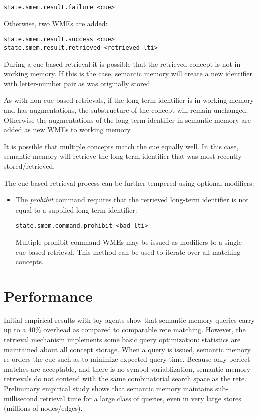 \begin{verbatim}
state.smem.result.failure <cue>
\end{verbatim}

Otherwise, two WMEs are added:

\begin{verbatim}
state.smem.result.success <cue>
state.smem.result.retrieved <retrieved-lti>
\end{verbatim}

During a cue-based retrieval it is possible that the retrieved concept is not in working memory.  If this is the case, semantic memory will create a new identifier with letter-number pair as was originally stored.

As with non-cue-based retrievals, if the long-term identifier is in working memory and has augmentations, the substructure of the concept will remain unchanged. Otherwise the augmentations of the long-term identifier in semantic memory are added as new WMEs to working memory.

It is possible that multiple concepts match the cue equally well.  In this case, semantic memory will retrieve the long-term identifier that was most recently stored/retrieved.

The cue-based retrieval process can be further tempered using optional modifiers:

\begin{itemize}
\item The \emph{prohibit} command requires that the retrieved long-term identifier is not equal to a supplied long-term identifier:
\begin{verbatim}
state.smem.command.prohibit <bad-lti>
\end{verbatim}
Multiple prohibit command WMEs may be issued as modifiers to a single cue-based retrieval.  This method can be used to iterate over all matching concepts.
\end{itemize}

\section{Performance}
\label{SMEM-perf}

Initial empirical results with toy agents show that semantic memory queries carry up to a 40\% overhead as compared to comparable rete matching.  However, the retrieval mechanism implements some basic query optimization: statistics are maintained about all concept storage.  When a query is issued, semantic memory re-orders the cue such as to minimize expected query time.  Because only perfect matches are acceptable, and there is no symbol variablization, semantic memory retrievals do not contend with the same combinatorial search space as the rete.  Preliminary empirical study shows that semantic memory maintains sub-millisecond retrieval time for a large class of queries, even in very large stores (millions of nodes/edges).

